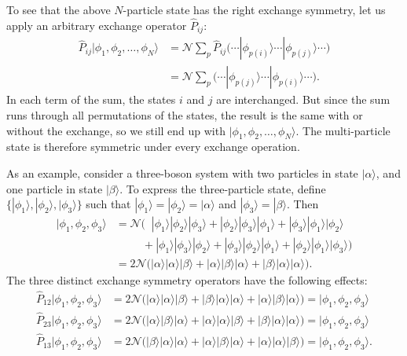 \documentclass[pra,12pt]{revtex4}
\begin{document}
To see that the above $N$-particle state has the right exchange
symmetry, let us apply an arbitrary exchange operator $\hat{P}_{ij}$:
$$\begin{aligned}\hat{P}_{ij}|\phi_1,\phi_2,\dots,\phi_N\rangle &= \mathcal{N} \sum_p \hat{P}_{ij} \Big(\cdots  |\phi_{p(i)}\rangle  \cdots  |\phi_{p(j)}\rangle\cdots\Big) \\&= \mathcal{N} \sum_p \Big(\cdots  |\phi_{p(j)}\rangle  \cdots  |\phi_{p(i)}\rangle\cdots\Big).\end{aligned}$$
In each term of the sum, the states $i$ and $j$ are interchanged.  But
since the sum runs through all permutations of the states, the result
is the same with or without the exchange, so we still end up with
$|\phi_1,\phi_2,\dots,\phi_N\rangle$.  The multi-particle state is
therefore symmetric under every exchange operation.

As an example, consider a three-boson system with two particles in
state $|\alpha\rangle$, and one particle in state $|\beta\rangle$.  To express
the three-particle state, define $\{|\phi_1\rangle, |\phi_2\rangle,
|\phi_3\rangle\}$ such that $|\phi_1\rangle = |\phi_2\rangle =
|\alpha\rangle$ and $|\phi_3\rangle = |\beta\rangle$.  Then
$$\begin{aligned}|\phi_1,\phi_2,\phi_3\rangle &= \mathcal{N} \Big( \;\;
|\phi_1\rangle|\phi_2\rangle|\phi_3\rangle +
|\phi_2\rangle|\phi_3\rangle|\phi_1\rangle +
|\phi_3\rangle|\phi_1\rangle|\phi_2\rangle \\ &\qquad\;\, +
|\phi_1\rangle|\phi_3\rangle|\phi_2\rangle +
|\phi_3\rangle|\phi_2\rangle|\phi_1\rangle +
|\phi_2\rangle|\phi_1\rangle|\phi_3\rangle\Big) \\
&= 2\mathcal{N} \Big(
|\alpha\rangle|\alpha\rangle|\beta\rangle +
|\alpha\rangle|\beta\rangle|\alpha\rangle +
|\beta\rangle|\alpha\rangle|\alpha\rangle\Big).
\end{aligned}$$
The three distinct exchange symmetry operators have the following effects:
$$\begin{aligned}\hat{P}_{12}|\phi_1,\phi_2,\phi_3\rangle &= 2\mathcal{N} \Big(
|\alpha\rangle|\alpha\rangle|\beta\rangle +
|\beta\rangle|\alpha\rangle|\alpha\rangle +
|\alpha\rangle|\beta\rangle|\alpha\rangle\Big) = |\phi_1,\phi_2,\phi_3\rangle \\
\hat{P}_{23}|\phi_1,\phi_2,\phi_3\rangle &= 2\mathcal{N} \Big(
|\alpha\rangle|\beta\rangle|\alpha\rangle +
|\alpha\rangle|\alpha\rangle|\beta\rangle +
|\beta\rangle|\alpha\rangle|\alpha\rangle\Big) = |\phi_1,\phi_2,\phi_3\rangle\\
\hat{P}_{13}|\phi_1,\phi_2,\phi_3\rangle &= 2\mathcal{N} \Big(
|\beta\rangle|\alpha\rangle|\alpha\rangle +
|\alpha\rangle|\beta\rangle|\alpha\rangle +
|\alpha\rangle|\alpha\rangle|\beta\rangle\Big) = |\phi_1,\phi_2,\phi_3\rangle.
\end{aligned}$$
\end{document}

